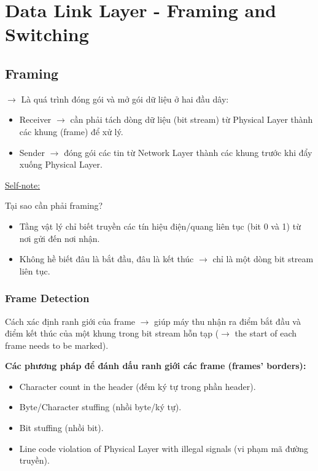 \chapter{Data Link Layer - Framing and Switching}

\section{Framing}

\noindent
$\rightarrow$ Là quá trình đóng gói và mở gói dữ liệu ở hai đầu dây:

\begin{itemize}
    \item Receiver $\rightarrow$ cần phải tách dòng dữ liệu (bit stream) từ Physical Layer thành các khung (frame) để xử lý.
    \item Sender $\rightarrow$ đóng gói các tin từ Network Layer thành các khung trước khi đẩy xuống Physical Layer.
\end{itemize}
\medskip

\noindent
\underline{Self-note:} 
\medskip

\noindent
Tại sao cần phải framing?

\begin{itemize}
    \item[$\rightarrow$] Tầng vật lý chỉ biết truyền các tín hiệu điện/quang liên tục (bit 0 và 1) từ nơi gửi đến nơi nhận.
    \item[$\Rightarrow$] Không hề biết đâu là bắt đầu, đâu là kết thúc $\rightarrow$ chỉ là một dòng bit stream liên tục.
\end{itemize}
\medskip

\subsection{Frame Detection}

\noindent
Cách xác định ranh giới của frame $\rightarrow$ giúp máy thu nhận ra điểm bắt đầu và điểm kết thúc của một khung trong bit stream hỗn tạp ($\rightarrow$ the start of each frame needs to be marked).
\medskip

\noindent
\textbf{Các phương pháp để đánh dấu ranh giới các frame (frames' borders):}

\begin{itemize}
    \item Character count in the header (đếm ký tự trong phần header).
    \item Byte/Character stuffing (nhồi byte/ký tự).
    \item Bit stuffing (nhồi bit).
    \item Line code violation of Physical Layer with illegal signals (vi phạm mã đường truyền).
\end{itemize}

